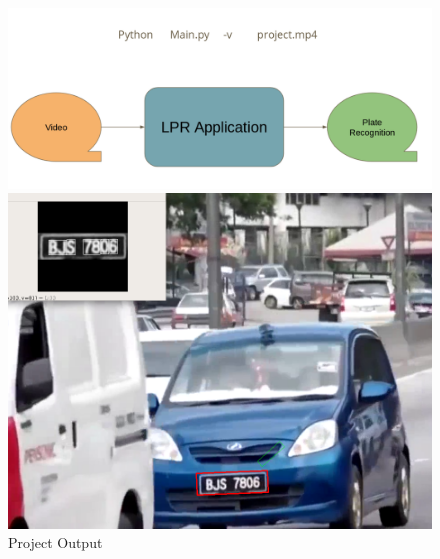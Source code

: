 \documentclass[letterpaper,12pt]{article}
\begin{document}
\begin{figure}
	\centering
	\begin{minipage}[b]{.4\textwidth}
		\centering \includegraphics[width=0.8\columnwidth]{demo.png}
		
		\caption{
			\label{fig:11} %
			Demo.
		}
		
	\end{minipage}\qquad
	\begin{minipage}[b]{.4\textwidth}
		
		\centering \includegraphics[width=0.8\columnwidth]{out.png}
		
		\caption{
			\label{fig:12} %
			Project Output
		}
		
	\end{minipage}
\end{figure}
\end{document}
